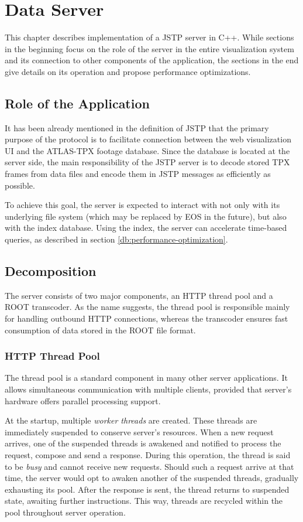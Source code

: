 \chapter{Data Server}
This chapter describes implementation of a JSTP server in C++. While sections in the beginning focus on the role of the server in the entire visualization system and its connection to other components of the application, the sections in the end give details on its operation and propose performance optimizations.

\section{Role of the Application}
It has been already mentioned in the definition of JSTP that the primary purpose of the protocol is to facilitate connection between the web visualization UI and the ATLAS-TPX footage database. Since the database is located at the server side, the main responsibility of the JSTP server is to decode stored TPX frames from data files and encode them in JSTP messages as efficiently as possible.

To achieve this goal, the server is expected to interact with not only with its underlying file system (which may be replaced by EOS in the future), but also with the index database. Using the index, the server can accelerate time-based queries, as described in section \ref{db:performance-optimization}.

\todo

\section{Decomposition}
The server consists of two major components, an HTTP thread pool and a ROOT transcoder. As the name suggests, the thread pool is responsible mainly for handling outbound HTTP connections, whereas the transcoder ensures fast consumption of data stored in the ROOT file format.

\subsection{HTTP Thread Pool}
The thread pool is a standard component in many other server applications. It allows simultaneous communication with multiple clients, provided that server's hardware offers parallel processing support.

At the startup, multiple \textit{worker threads} are created. These threads are immediately suspended to conserve server's resources. When a new request arrives, one of the suspended threads is awakened and notified to process the request, compose and send a response. During this operation, the thread is said to be \textit{busy} and cannot receive new requests. Should such a request arrive at that time, the server would opt to awaken another of the suspended threads, gradually exhausting its pool. After the response is sent, the thread returns to suspended state, awaiting further instructions. This way, threads are recycled within the pool throughout server operation.

